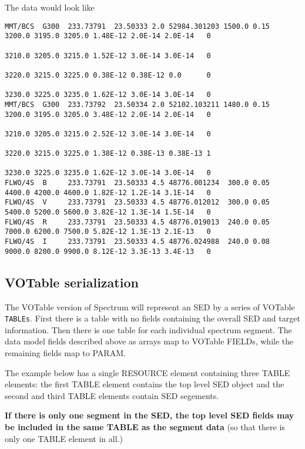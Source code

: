 \documentclass[11pt]{article}
\begin{document}
The data would look like
{\tiny
\begin{verbatim}
MMT/BCS  G300  233.73791  23.50333 2.0 52984.301203 1500.0 0.15  3200.0 3195.0 3205.0 1.48E-12 2.0E-14 2.0E-14   0
                                                                 3210.0 3205.0 3215.0 1.52E-12 3.0E-14 3.0E-14   0
                                                                 3220.0 3215.0 3225.0 0.38E-12 0.38E-12 0.0      0
                                                                 3230.0 3225.0 3235.0 1.62E-12 3.0E-14 3.0E-14   0
MMT/BCS  G300  233.73792  23.50334 2.0 52102.103211 1480.0 0.15  3200.0 3195.0 3205.0 3.48E-12 2.0E-14 2.0E-14   0
                                                                 3210.0 3205.0 3215.0 2.52E-12 3.0E-14 3.0E-14   0
                                                                 3220.0 3215.0 3225.0 1.38E-12 0.38E-13 0.38E-13 1
                                                                 3230.0 3225.0 3235.0 1.62E-12 3.0E-14 3.0E-14   0
FLWO/4S  B     233.73791  23.50333 4.5 48776.001234  300.0 0.05  4400.0 4200.0 4600.0 1.82E-12 1.2E-14 3.1E-14   0
FLWO/4S  V     233.73791  23.50333 4.5 48776.012012  300.0 0.05  5400.0 5200.0 5600.0 3.82E-12 1.3E-14 1.5E-14   0
FLWO/4S  R     233.73791  23.50333 4.5 48776.019013  240.0 0.05  7000.0 6200.0 7500.0 5.82E-12 1.3E-13 2.1E-13   0
FLWO/4S  I     233.73791  23.50333 4.5 48776.024988  240.0 0.08  9000.0 8200.0 9900.0 8.12E-12 3.3E-13 3.4E-13   0
\end{verbatim}
}

\clearpage

\subsection{VOTable serialization}

The VOTable version of Spectrum will represent an SED
by a series of VOTable \verb+TABLEs+. 
First there is a table with no fields
containing the overall SED and target information. Then there
is one table for each individual spectrum segment.
The data model fields described above as arrays map to
VOTable FIELDs, while the remaining fields map to PARAM.

The example below has a single RESOURCE element containing three TABLE
elements: the first TABLE element contains the top level SED object
and the second and third TABLE elements contain SED segements.

{\bf If there is only one segment in the SED, the top level SED fields
may be included in the same TABLE as the segment data }  (so that there
is only one TABLE element in all.)
\end{document}
